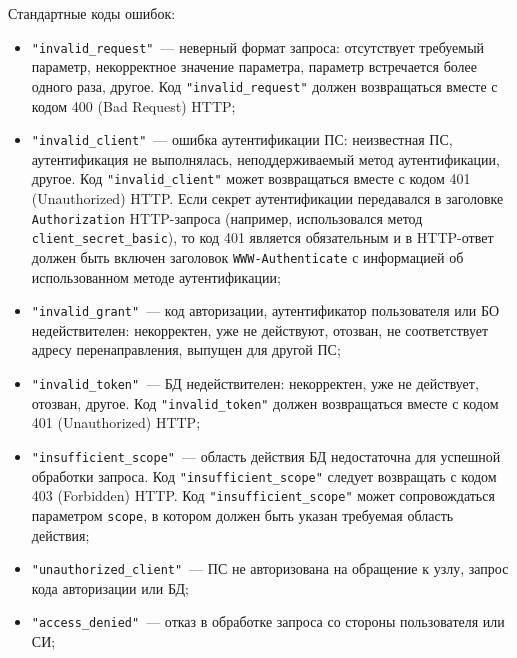 Стандартные коды ошибок:
\begin{itemize}
\item
\lstinline{"invalid_request"}~---
неверный формат запроса: отсутствует требуемый параметр, некорректное значение
параметра, параметр встречается более одного раза, другое.
%
Код \lstinline{"invalid_request"} должен возвращаться вместе с кодом 400 
(Bad Request) HTTP;

\item
\lstinline{"invalid_client"}~---
ошибка аутентификации ПС: неизвестная ПС, аутентификация не выполнялась, 
неподдерживаемый метод аутентификации, другое.
%
Код \lstinline{"invalid_client"} может возвращаться вместе с кодом 401 
(Unauthorized) HTTP.
%
Если секрет аутентификации передавался в заголовке \lstinline{Authorization} 
HTTP-запроса (например, использовался метод \lstinline{client_secret_basic}),
то код 401 является обязательным и в HTTP-ответ должен быть включен заголовок 
\lstinline{WWW-Authenticate} с информацией об использованном методе 
аутентификации;
%

\item
\lstinline{"invalid_grant"}~---
код авторизации, аутентификатор пользователя или БО недействителен: 
некорректен, уже не действуют, отозван, 
не соответствует адресу перенаправления, выпущен для другой ПС;
%

\item
\lstinline{"invalid_token"}~--- 
БД недействителен: некорректен, уже не действует, отозван, другое. 
%
Код \lstinline{"invalid_token"} должен возвращаться вместе с кодом 
401 (Unauthorized) HTTP;

\item
\lstinline{"insufficient_scope"}~---
область действия БД недостаточна для успешной обработки запроса.
%
Код \lstinline{"insufficient_scope"} следует возвращать с кодом 
403 (Forbidden) HTTP. 
%
Код \lstinline{"insufficient_scope"} может сопровождаться
параметром \lstinline{scope}, в котором должен быть указан требуемая
область действия;

\item
\lstinline{"unauthorized_client"}~--- 
ПС не авторизована на обращение к узлу, запрос кода авторизации или БД;

\item
\lstinline{"access_denied"}~---
отказ в обработке запроса со стороны пользователя или СИ;


\end{itemize}
